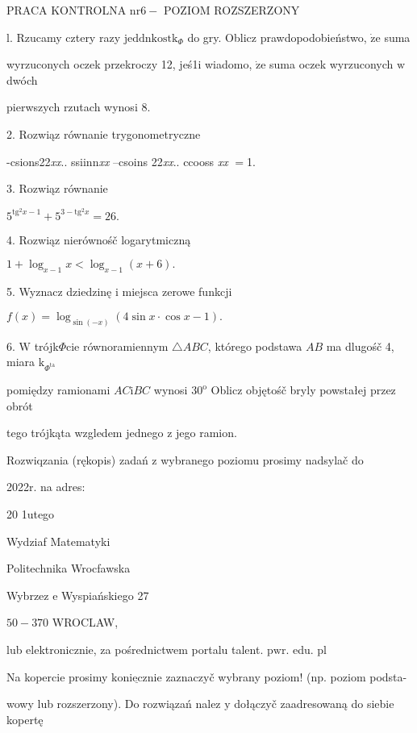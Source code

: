 \documentclass[a4paper,12pt]{article}
\begin{document}
PRACA KONTROLNA $\mathrm{n}\mathrm{r} 6-$ POZIOM ROZSZERZONY

l. Rzucamy cztery razy $\mathrm{j}\mathrm{e}\mathrm{d}\mathrm{d}\mathrm{n}\mathrm{k}\mathrm{o}\mathrm{s}\mathrm{t}\mathrm{k}_{\Phi}$ do gry. Oblicz prawdopodobieństwo, $\dot{\mathrm{z}}\mathrm{e}$ suma

wyrzuconych oczek przekroczy 12, jeś1i wiadomo, $\dot{\mathrm{z}}\mathrm{e}$ suma oczek wyrzuconych $\mathrm{w}$ dwóch

pierwszych rzutach wynosi 8.

2. Rozwiąz równanie trygonometryczne

-csions22{\it xx}.. ssiinn{\it xx} --csoins 22{\it xx}.. ccooss {\it xx} $=$1.

3. Rozwiąz równanie

$5^{\mathrm{t}\mathrm{g}^{2}x-1}+5^{3-\mathrm{t}\mathrm{g}^{2}x}=26.$

4. Rozwiąz nierównośč logarytmiczną

$1+\log_{x-1}x<\log_{x-1}(x+6).$

5. Wyznacz dziedzinę $\mathrm{i}$ miejsca zerowe funkcji

$f(x)=\log_{\sin(-x)}(4\sin x\cdot\cos x-1).$

6. $\mathrm{W}$ trójk$\Phi$cie równoramiennym $\triangle ABC$, którego podstawa $AB$ ma dlugośč 4, miara $\mathrm{k}_{\Phi^{\mathrm{t}\mathrm{a}}}$

pomiędzy ramionami $AC\mathrm{i}BC$ wynosi $30^{\mathrm{o}}$ Oblicz objętośč bryly powstałej przez obrót

tego trójkąta wzgledem jednego $\mathrm{z}$ jego ramion.

Rozwiqzania (rękopis) zadań z wybranego poziomu prosimy nadsylač do

2022r. na adres:

20 1utego

Wydziaf Matematyki

Politechnika Wrocfawska

Wybrzez $\mathrm{e}$ Wyspiańskiego 27

$50-370$ WROCLAW,

lub elektronicznie, za pośrednictwem portalu talent. $\mathrm{p}\mathrm{w}\mathrm{r}$. edu. pl

Na kopercie prosimy $\underline{\mathrm{k}\mathrm{o}\mathrm{n}\mathrm{i}\mathrm{e}\mathrm{c}\mathrm{z}\mathrm{n}\mathrm{i}\mathrm{e}}$ zaznaczyč wybrany poziom! (np. poziom podsta-

wowy lub rozszerzony). Do rozwiązań nalez $\mathrm{y}$ dołączyč zaadresowaną do siebie kopertę
\end{document}
